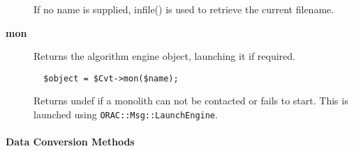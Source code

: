 \begin{description}
If no name is supplied, infile() is used to retrieve the current
filename.


\item[\textbf{mon}] \mbox{}

Returns the algorithm engine object, launching it if required.

\begin{verbatim}
  $object = $Cvt->mon($name);
\end{verbatim}


Returns undef if a monolith can not be contacted or fails to start.
This is launched using \texttt{ORAC::Msg::LaunchEngine}.

\end{description}
\paragraph*{Data Conversion Methods\label{ORAC::Convert_Data_Conversion_Methods}}

